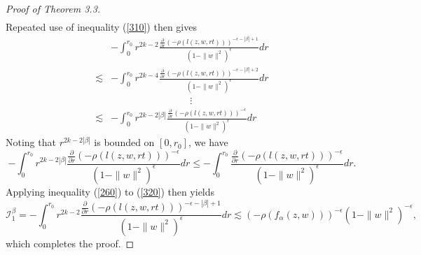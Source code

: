 \documentclass[reqno,12pt]{amsart}
\numberwithin{equation}{section}
\begin{document}
\begin{proof}[Proof of Theorem 3.3]
{\begin{align}
			\end{align}
			Repeated use of inequality (\ref{310}) then gives
			\begin{align}\label{32}
			&-\int_{0}^{r_0}r^{2k-2}\frac{\frac{\partial}{\partial r}{\left(-\rho\left(l(z,w,r t)\right)\right)^{-\epsilon-|\beta|+1}}}{(1-\|w\|^2)^{\epsilon}}dr\nonumber\\\lesssim&-\int_{0}^{r_0}r^{2k-4}\frac{\frac{\partial}{\partial r}{\left(-\rho\left(l(z,w,r t)\right)\right)^{-\epsilon-|\beta|+2}}}{(1-\|w\|^2)^{\epsilon}}dr\nonumber\\&\;\;\;\;\;\;\;\;\;\;\;\;\;\;\;\;\;\;\;\;\;\;\;\;\;\;\;\;\;\nonumber\vdots\\\lesssim&-\int_{0}^{r_0}r^{2k-2|\beta|}\frac{\frac{\partial}{\partial r}{\left(-\rho\left(l(z,w,r t)\right)\right)^{-\epsilon}}}{(1-\|w\|^2)^{\epsilon}}dr
			\end{align}
			Noting that $r^{2k-2|\beta|}$ is bounded on $[0,r_0]$, we have
				\begin{equation}\label{320}
			-\int_{0}^{r_0}r^{2k-2|\beta|}\frac{\frac{\partial}{\partial r}{\left(-\rho\left(l(z,w,r t)\right)\right)^{-\epsilon}}}{(1-\|w\|^2)^{\epsilon}}dr\leq-\int_{0}^{r_0}\frac{\frac{\partial}{\partial r}{\left(-\rho\left(l(z,w,r t)\right)\right)^{-\epsilon}}}{(1-\|w\|^2)^{\epsilon}}dr.
				\end{equation}
Applying inequality (\ref{260}) to (\ref{320}) then yields
	 \begin{equation}\mathcal I^{\beta}_1=-\int_{0}^{r_0}r^{2k-2}\frac{\frac{\partial}{\partial r}{\left(-\rho\left(l(z,w,r t)\right)\right)^{-\epsilon-|\beta|+1}}}{(1-\|w\|^2)^{\epsilon}}dr\lesssim\left(-\rho\left(f_{\alpha}(z,w)\right)\right)^{-\epsilon}(1-\|w\|^2)^{-\epsilon},
	 \end{equation}
	 which completes the proof.}
		\end{proof}
\end{document}
